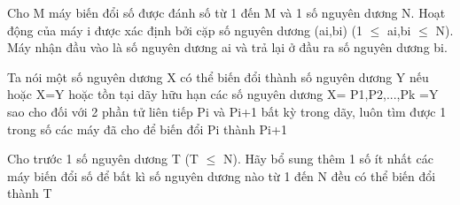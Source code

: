 Cho M máy biến đổi số được đánh số từ 1 đến M và 1 số nguyên dương N. Hoạt động của máy i được xác định bởi cặp số nguyên dương (ai,bi) (1 $\le$ ai,bi $\le$ N). Máy nhận đầu vào là số nguyên dương ai và trả lại ở đầu ra số nguyên dương bi.

Ta nói một số nguyên dương X có thể biến đổi thành số nguyên dương Y nếu hoặc X=Y hoặc tồn tại dãy hữu hạn các số nguyên dương X= P1,P2,...,Pk =Y sao cho đối với 2 phần tử liên tiếp Pi và Pi+1 bất kỳ trong dãy, luôn tìm được 1 trong số các máy đã cho để biến đổi Pi thành Pi+1

Cho trước 1 số nguyên dương T (T  $\le$  N). Hãy bổ sung thêm 1 số ít nhất các máy biến đổi số để bất kì số nguyên dương nào từ 1 đến N đều có thể biến đổi thành T